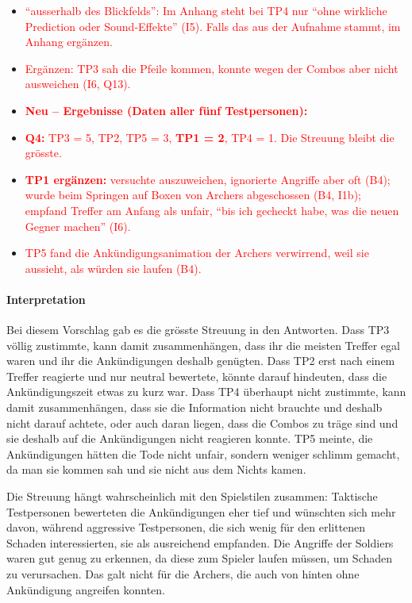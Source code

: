 \documentclass[../Main.tex]{subfiles}
\begin{document}
\begin{itemize}[leftmargin=1.5cm]
    \item \textcolor{red}{\enquote{ausserhalb des Blickfelds}: Im Anhang steht bei TP4 nur \enquote{ohne wirkliche Prediction oder Sound-Effekte} (I5). Falls das aus der Aufnahme stammt, im Anhang ergänzen.}
    \item \textcolor{red}{Ergänzen: TP3 sah die Pfeile kommen, konnte wegen der Combos aber nicht ausweichen (I6, Q13).}
\end{itemize}

\begin{itemize}[leftmargin=1.5cm]
    \item \textcolor{red}{\textbf{Neu -- Ergebnisse (Daten aller fünf Testpersonen):}}
    \item \textcolor{red}{\textbf{Q4:} TP3 = 5, TP2, TP5 = 3, \textbf{TP1 = 2}, TP4 = 1. Die Streuung bleibt die grösste.}
    \item \textcolor{red}{\textbf{TP1 ergänzen:} versuchte auszuweichen, ignorierte Angriffe aber oft (B4); wurde beim Springen auf Boxen von Archers abgeschossen (B4, I1b); empfand Treffer am Anfang als unfair, \enquote{bis ich gecheckt habe, was die neuen Gegner machen} (I6).}
    \item \textcolor{red}{TP5 fand die Ankündigungsanimation der Archers verwirrend, weil sie aussieht, als würden sie laufen (B4).}
\end{itemize}

\paragraph{Interpretation}
Bei diesem Vorschlag gab es die grösste Streuung in den Antworten. Dass TP3 völlig zustimmte, kann damit zusammenhängen, dass ihr die meisten Treffer egal waren und ihr die Ankündigungen deshalb genügten. Dass TP2 erst nach einem Treffer reagierte und nur neutral bewertete, könnte darauf hindeuten, dass die Ankündigungszeit etwas zu kurz war. Dass TP4 überhaupt nicht zustimmte, kann damit zusammenhängen, dass sie die Information nicht brauchte und deshalb nicht darauf achtete, oder auch daran liegen, dass die Combos zu träge sind und sie deshalb auf die Ankündigungen nicht reagieren konnte. TP5 meinte, die Ankündigungen hätten die Tode nicht unfair, sondern weniger schlimm gemacht, da man sie kommen sah und sie nicht aus dem Nichts kamen.

Die Streuung hängt wahrscheinlich mit den Spielstilen zusammen: Taktische Testpersonen bewerteten die Ankündigungen eher tief und wünschten sich mehr davon, während aggressive Testpersonen, die sich wenig für den erlittenen Schaden interessierten, sie als ausreichend empfanden. Die Angriffe der Soldiers waren gut genug zu erkennen, da diese zum Spieler laufen müssen, um Schaden zu verursachen. Das galt nicht für die Archers, die auch von hinten ohne Ankündigung angreifen konnten.
\end{document}
